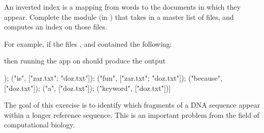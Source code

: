 \documentclass{pset}
\begin{document}

An inverted index is a mapping from words to the documents in which they
appear.  Complete the  module (in )
that takes in a master list of files, and computes an index on those files.

For example, if the files ,  and
 contained the following:

\begin{center}
\end{center}

then running the  app on  should produce
the output
\begin{ocaml}
[("ocaml", ["zar.txt"]);            ("is", ["zar.txt"; "doz.txt"]);
 ("fun",   ["zar.txt"; "doz.txt"]); ("because", ["doz.txt"]);
 ("a",     ["doz.txt"]);            ("keyword", ["doz.txt"])]
\end{ocaml}


The goal of this exercise is to identify which fragments of a DNA sequence
appear within a longer reference sequence.  This is an important problem from
the field of computational biology.
\end{document}
